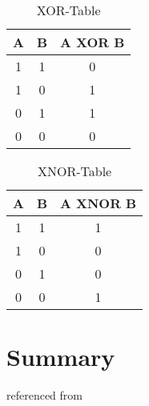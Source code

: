 \documentclass{article}
\begin{document}
\begin{table}
	\begin{center}
		\label{tab:table6}
		\caption{XOR-Table}
		\begin{tabular}{|c|c|c|}
			A & B &A XOR B\\
			\hline
			1&1&0\\
			1&0&1\\
			0&1&1\\
			0&0&0\\
		\end{tabular}
	\end{center}
\end{table}

\begin{table}
	\begin{center}
		\label{tab:table7}
		\caption{XNOR-Table}
		\begin{tabular}{|c|c|c|}
			A & B & A XNOR B\\
			\hline
			1&1&1\\
			1&0&0\\
			0&1&0\\
			0&0&1\\
		\end{tabular}
	\end{center}
\end{table}
\newpage
\section{Summary}
referenced from\cite{Okoacha2021logig}



\end{document}
